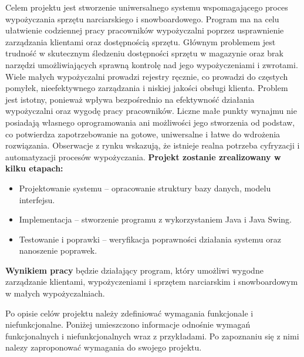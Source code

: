     Celem projektu jest stworzenie uniwersalnego systemu wspomagającego proces wypożyczania sprzętu narciarskiego i snowboardowego. Program ma na celu ułatwienie codziennej pracy pracowników wypożyczalni poprzez usprawnienie zarządzania klientami oraz dostępnością sprzętu.
    \newline \indent
    Głównym problemem jest trudność w skutecznym śledzeniu dostępności sprzętu w magazynie oraz brak narzędzi umożliwiających sprawną kontrolę nad jego wypożyczeniami i zwrotami. Wiele małych wypożyczalni prowadzi rejestry ręcznie, co prowadzi do częstych pomyłek, nieefektywnego zarządzania i niskiej jakości obsługi klienta.
    \newline \indent
    Problem jest istotny, ponieważ wpływa bezpośrednio na efektywność działania wypożyczalni oraz wygodę pracy pracowników. Liczne małe punkty wynajmu nie posiadają własnego oprogramowania ani możliwości jego stworzenia od podstaw, co potwierdza zapotrzebowanie na gotowe, uniwersalne i łatwe do wdrożenia rozwiązania. Obserwacje z rynku wskazują, że istnieje realna potrzeba cyfryzacji i automatyzacji procesów wypożyczania.
    \vspace{10pt} \newline 
    \textbf{Projekt zostanie zrealizowany w kilku etapach:}
    \begin{itemize}
        \item Projektowanie systemu – opracowanie struktury bazy danych, modelu interfejsu.
        \item Implementacja – stworzenie programu z wykorzystaniem Java i Java Swing.
        \item Testowanie i poprawki – weryfikacja poprawności działania systemu oraz nanoszenie poprawek.
    \end{itemize}
    \textbf{Wynikiem pracy} będzie działający program, który umożliwi wygodne zarządzanie klientami, wypożyczeniami i sprzętem narciarskim i snowboardowym w małych wypożyczalniach.

\setlength{\parskip}{1em}
Po opisie celów projektu należy zdefiniować wymagania funkcjonale i niefunkcjonalne. Poniżej umieszczono informacje odnośnie wymagań funkcjonalnych i niefunkcjonalnych wraz z przykładami. Po zapoznaniu się z nimi nalezy zaproponować wymagania do swojego projektu. 

